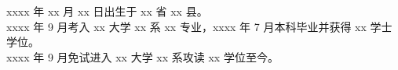 \noindent xxxx 年 xx 月 xx 日出生于 xx 省 xx 县。\\
\noindent xxxx 年 9 月考入 xx 大学 xx 系 xx 专业，xxxx 年 7 月本科毕业并获得 xx 学士学位。\\
\noindent xxxx 年 9 月免试进入 xx 大学 xx 系攻读 xx 学位至今。


\begin{refsection}
\setcounter{gbnamefmtcase}{1}%
\nocite{ref-1-1-Yang,ref-2-1-杨轶,ref-3-1-杨轶,ref-4-1-Yang,ref-5-1-Wu,ref-6-1-贾泽,ref-7-1-伍晓明}

\printbibliography[title={发表论文：}] %

\end{refsection}


\begin{refsection}
\setcounter{gbnamefmtcase}{1}%
\nocite{ref-8-1-任天令,ref-9-1-Ren}

\printbibliography[title={研究成果：}]

\end{refsection}
